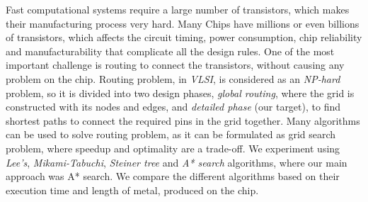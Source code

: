 Fast computational systems require a large number of transistors, which makes their manufacturing process very hard.
Many Chips have millions or even billions of transistors, which affects the circuit timing, power consumption, chip reliability and manufacturability that complicate all the design rules.
One of the most important challenge is routing to connect the transistors, without causing any problem on the chip.
Routing problem, in \emph{VLSI}, is considered as an \emph{NP-hard} problem, so it is divided into two design phases, \emph{global routing}, where the grid is constructed with its nodes and edges,
and \emph{detailed phase} (our target), to find shortest paths to connect the required pins in the grid together.
Many algorithms can be used to solve routing problem, as it can be formulated as grid search problem, where speedup and optimality are a trade-off.
We experiment using \emph{Lee's}, \emph{Mikami-Tabuchi}, \emph{Steiner tree} and \emph{A* search} algorithms, where our main approach was A* search.
We compare the different algorithms based on their execution time and length of metal, produced on the chip.